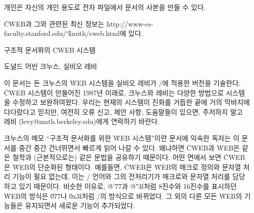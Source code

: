 \smallskip\noindent
개인은 자신의 개인 용도로 전자 파일에서 문서의 사본을 만들 수 있다.

\smallskip\noindent
\.{CWEB}과 그와 관련된 최신 정보는 
\.{http://www-cs-faculty.stanford.edu/\char`\~knuth/cweb.html}에 있다.

 \titletrue\eject

\titletrue
\centerline{\titlefont 구조적 문서화의 {\ttitlefont CWEB} 시스템}

\centerline{도널드 어빈 크누스, 실비오 레비}

\noindent
이 문서는 돈 크누스의 \.{WEB} 시스템을 실비오 레비가 \CEE/에 적용한 버전을 기술한다.
\.{CWEB} 시스템이 만들어진 1987년 이래로, 크누스와 레비는 다양한 방법으로 시스템을 수정하고
보완하여왔다. 우리는 현재의 시스템이 진화를 거듭한 끝에 거의 막바지에 다다랐다고 믿지만,
여전히 오류 신고, 제안 사항, 도움말들이 있으면, 주저하지 말고 레비
(\.{levy@math.berkeley.edu})에게 연락하기 바란다.

크누스의 메모 ``구조적 문서화를 위한 \.{WEB} 시스템''이란 문서에 익숙한 독자는 이 문서를
중간 중간 건너뛰면서 빠르게 읽어 나갈 수 있다. 왜냐하면  \.{CWEB}과 \.{WEB}은 같은 철학과
(근본적으로는) 같은 문법을 공유하기 때문이다. 어떤 면에서 보면 \.{CWEB}은 \.{WEB}의
단순화된 형태이다. 예를들면, \.{CWEB}은 \.{WEB}의 매크로 정의와 문자열 처리 기능이 필요
없는데, 이는 \CEE/ 언어와 그의 전처리기가 매크로와 문자열 처리를 담당하고 있기 때문이다.
비슷한 이유로, \.{@'77}과 \.{@"3f}처럼 8진수와 16진수를 표시하던  \.{WEB}의 방식은
\.{077}나 \.{0x3f}처럼 \CEE/의 방식으로 바뀌었다.
그 외의 다른 모든 \.{WEB}의 기능들은 유지되면서 새로운 기능이 추가되었다.

